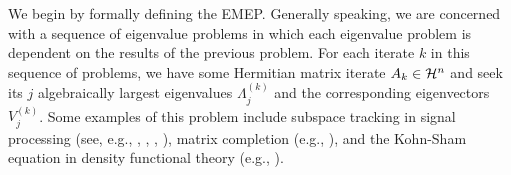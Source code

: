 We begin by formally defining the EMEP.
Generally speaking, we are concerned with a sequence of eigenvalue problems in which each eigenvalue problem is dependent on the results of the previous problem.  
For each iterate $k$ in this sequence of problems, we have some Hermitian matrix iterate $A_k \in {\mathcal H}^n$ and seek its $j$ algebraically largest eigenvalues $\Lambda^{(k)}_j$ and the corresponding eigenvectors $V^{(k)}_j$.  
Some examples of this problem include subspace tracking in signal processing (see, e.g., \cite{comon1990tracking}, \cite{stewart1992updating}, \cite{yang1995projection}, \cite{doukopoulos2008fast}), matrix completion (e.g., \cite{ngo2012scaled}), and the Kohn-Sham equation in density functional theory (e.g., \cite{saad2010numerical}).









